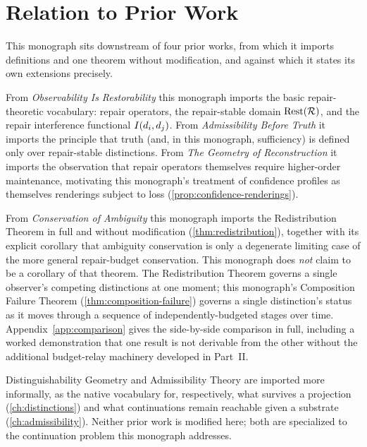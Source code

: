 \chapter*{Relation to Prior Work}

This monograph sits downstream of four prior works, from which it
imports definitions and one theorem without modification, and against
which it states its own extensions precisely.

From \emph{Observability Is Restorability} this monograph imports the
basic repair-theoretic vocabulary: repair operators, the repair-stable
domain $\mathrm{Rest}(\mathcal{R})$, and the repair interference functional
$I(d_i,d_j)$. From \emph{Admissibility Before Truth} it imports
the principle that truth (and, in this monograph, sufficiency) is
defined only over repair-stable distinctions. From \emph{The Geometry
of Reconstruction} it imports the observation that repair operators
themselves require higher-order maintenance, motivating this
monograph's treatment of confidence profiles as themselves renderings
subject to loss (\cref{prop:confidence-renderings}).

From \emph{Conservation of Ambiguity} this monograph imports the
Redistribution Theorem in full and without modification
(\cref{thm:redistribution}), together with its explicit corollary that
ambiguity conservation is only a degenerate limiting case of the more
general repair-budget conservation. This monograph does \emph{not}
claim to be a corollary of that theorem. The Redistribution Theorem
governs a single observer's competing distinctions at one moment; this
monograph's Composition Failure Theorem
(\cref{thm:composition-failure}) governs a single distinction's status
as it moves through a sequence of independently-budgeted stages over
time. Appendix~\ref{app:comparison} gives the side-by-side comparison
in full, including a worked demonstration that one result is not
derivable from the other without the additional budget-relay
machinery developed in Part~II.

Distinguishability Geometry and Admissibility Theory are imported more
informally, as the native vocabulary for, respectively, what survives
a projection (\cref{ch:distinctions}) and what continuations remain
reachable given a substrate (\cref{ch:admissibility}). Neither prior
work is modified here; both are specialized to the continuation
problem this monograph addresses.

